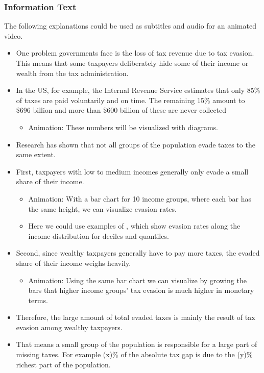 \documentclass[11pt]{article}
\begin{document}
\subsubsection*{Information Text}
The following explanations could be used as subtitles and audio for an animated video.
\begin{itemize}
    \item One problem governments face is the loss of tax revenue due to tax evasion. This means that some taxpayers deliberately hide some of their income or wealth from the tax administration. 
    \item In the US, for example, the Internal Revenue Service estimates that only 85\% of taxes are paid voluntarily and on time. The remaining 15\% amount to \$696 billion and more than \$600 billion of these are never collected
    \begin{itemize}
        \item Animation: These numbers will be visualized with diagrams.
    \end{itemize}
    \item Research has shown that not all groups of the population evade taxes to the same extent. 
    \item First, taxpayers with low to medium incomes generally only evade a small share of their income.
    \begin{itemize}
        \item Animation: With a bar chart for 10 income groups, where each bar has the same height, we can visualize evasion rates.  
        \item Here we could use examples of \cite{johns2010distribution}, which show evasion rates along the income distribution for deciles and quantiles.
    \end{itemize}
    \item Second, since wealthy taxpayers generally have to pay more taxes, the evaded share of their income weighs heavily. 
    \begin{itemize}
        \item Animation: Using the same bar chart we can visualize by growing the bars that higher income groups' tax evasion is much higher in monetary terms.
    \end{itemize}
    \item Therefore, the large amount of total evaded taxes is mainly the result of tax evasion among wealthy taxpayers.
    \item That means a small group of the population is responsible for a large part of missing taxes. For example (x)\% of the absolute tax gap is due to the (y)\% richest part of the population. 

\end{itemize}
\end{document}
